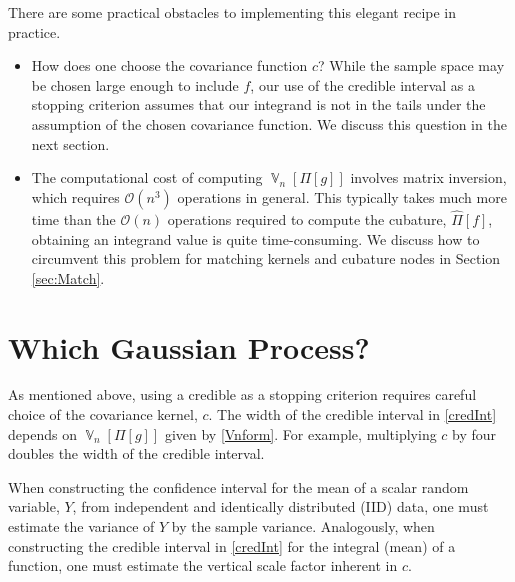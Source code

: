 \documentclass[sts]{imsart}
\numberwithin{equation}{section}
\theoremstyle{plain}
\DeclareMathOperator{\Var}{\mathbb{V}}
\begin{document}
There are some practical obstacles to implementing this elegant recipe in practice. 

\begin{itemize} 

\item How does one choose the covariance function $c$?  While the sample space may be chosen large enough to include $f$, our use of the credible interval as a stopping criterion assumes that our integrand is not in the tails under the assumption of the chosen covariance function.  We discuss this question in the next section.  

\item The computational cost of computing $\Var_n[\Pi[g]]$ involves matrix inversion, which requires $\mathcal{O}(n^3)$ operations in general.  This typically takes much more time than the $\mathcal{O}(n)$ operations required to compute the cubature, $\hat{\Pi}[f]$, obtaining an integrand value is quite time-consuming. We discuss how to circumvent this problem for matching kernels and cubature nodes in Section \ref{sec:Match}.

\end{itemize}

\section{Which Gaussian Process?} \label{sec:WhichGauss}
As mentioned above, using a credible as a stopping criterion requires careful choice of the covariance kernel, $c$.  The width of the credible interval in \eqref{credInt} depends on $\Var_n[\Pi[g]]$ given by \eqref{Vnform}.  For example, multiplying $c$ by four doubles the width of the credible interval.  

When constructing the confidence interval for the mean of a scalar random variable, $Y$, from independent and identically distributed (IID) data, one must estimate the variance of $Y$ by the sample variance. Analogously, when constructing the credible interval in \eqref{credInt} for the integral (mean) of a function, one must estimate the vertical scale factor inherent in $c$.
\end{document}
